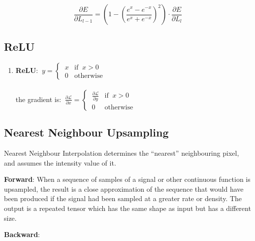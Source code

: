 \documentclass{article}
\begin{document}
\begin{multicols}{2}
\begin{equation}
\frac{\partial E}{{\partial L_{l-1}}} = (1 - {(\frac{e^{x}-e^{-x}}{e^{x}+e^{-x}})}^2) \cdot \frac{\partial E}{{\partial L_{l}}}
\label{eq:tanh_derivative}
\end{equation}

\subsection{ReLU}
\begin{enumerate}
Given a loss function $\mathcal{L}$, input $x$, output $y$ and activation function $f$, we are interested in $\frac{\partial{\mathcal{L}}}{\partial{x}}$ given that $y=f(x)$:

$$\frac{\partial{\mathcal{L}}}{\partial{x}}=\frac{\partial{\mathcal{L}}}{\partial{y}}\frac{\partial{y}}{\partial{x}}$$


\item \textbf{ReLU}: 
{$
\ y = \left\{
    \begin{array}{ll}
        \ x & \mbox{if } \ x > 0 \\
        \ 0 & \mbox{otherwise}
    \end{array}
\right.
$
\\
\\
the gradient is:
$
\ \frac{\partial {\mathcal{L}}}{\partial x} = \left\{
    \begin{array}{ll}
        \ \frac{\partial {\mathcal{L}}}{\partial y} & \mbox{if } \ x > 0 \\
        \ 0 & \mbox{otherwise}
    \end{array}
\right.
$
}
\\
\end{enumerate}
\subsection{Nearest Neighbour Upsampling}
Nearest Neighbour Interpolation determines the “nearest” neighbouring pixel, and assumes the intensity value of it.

\item \textbf{Forward}:
When a sequence of samples of a signal or other continuous function is upsampled, the result is a close approximation of the sequence that would have been produced if the signal had been sampled at a greater rate or density. The output is a repeated tensor which has the same shape as input but has a different size.
\item \textbf{Backward}:





\end{multicols}
\end{document}
